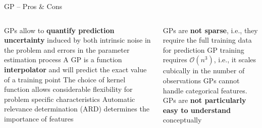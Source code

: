 \begin{frame}{GP -- Pros \& Cons}



\begin{columns}[onlytextwidth]
  \begin{column}{0.5\textwidth}
    \begin{itemize}
      \positem GPs allow to \textbf{quantify prediction uncertainty} induced by both intrinsic noise in the problem and errors in the parameter estimation process
      \positem A GP is a function \textbf{interpolator} and will predict the exact value of a training point
      \positem The choice of kernel function allows considerable flexibility for problem specific characteristics
      \positem Automatic relevance determination (ARD) determines the importance of features
    \end{itemize}
  \end{column}
  \begin{column}{0.5\textwidth}
    \begin{itemize}
      \negitem GPs are \textbf{not sparse}, i.e., they require the full training data for prediction
      \negitem GP training requires $\mathcal{O}(n^3)$, i.e., it scales cubically in the number of observations
      \negitem GPs cannot handle categorical features.
      \negitem GPs are \textbf{not particularly easy to understand} conceptually
    \end{itemize}
  \end{column}
\end{columns}

\end{frame}
